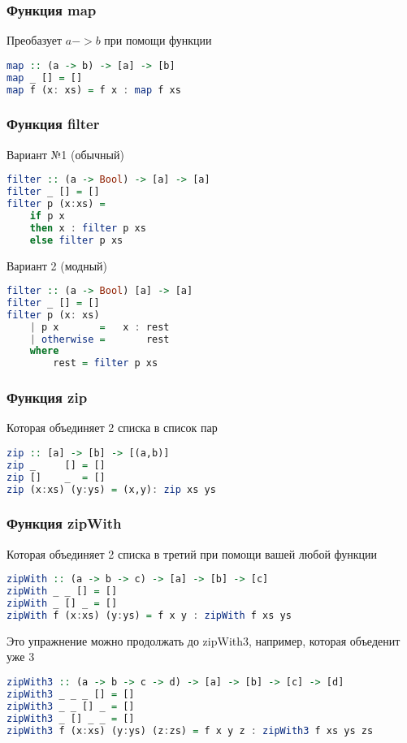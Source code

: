 \documentclass[10pt, a4paper]{article}
\begin{document}
\subsubsection{Функция map}

Преобазует $a -> b$ при помощи функции

\begin{lstlisting}[language=haskell]
map :: (a -> b) -> [a] -> [b]
map _ [] = []
map f (x: xs) = f x : map f xs
\end{lstlisting}

\subsubsection{Функция filter}

Вариант №1 (обычный)
\begin{lstlisting}[language=haskell]
filter :: (a -> Bool) -> [a] -> [a]
filter _ [] = []
filter p (x:xs) = 
    if p x 
    then x : filter p xs 
    else filter p xs
\end{lstlisting}

Вариант 2 (модный)
\begin{lstlisting}[language=haskell]
filter :: (a -> Bool) [a] -> [a]
filter _ [] = []
filter p (x: xs)
    | p x       =   x : rest
    | otherwise =       rest
    where 
        rest = filter p xs
\end{lstlisting}

\subsubsection{Функция zip}

Которая объединяет 2 списка в список пар

\begin{lstlisting}[language=haskell]
zip :: [a] -> [b] -> [(a,b)]
zip _     [] = []
zip []    _  = []
zip (x:xs) (y:ys) = (x,y): zip xs ys
\end{lstlisting}

\subsubsection{Функция zipWith}

Которая объединяет 2 списка в третий при помощи вашей любой функции

\begin{lstlisting}[language=haskell]
zipWith :: (a -> b -> c) -> [a] -> [b] -> [c]
zipWith _ _ [] = []
zipWith _ [] _ = []
zipWith f (x:xs) (y:ys) = f x y : zipWith f xs ys
\end{lstlisting}

Это упражнение можно продолжать до zipWith3, например, которая объеденит уже 3 

\begin{lstlisting}[language=haskell]
zipWith3 :: (a -> b -> c -> d) -> [a] -> [b] -> [c] -> [d]
zipWith3 _ _ _ [] = []
zipWith3 _ _ [] _ = []
zipWith3 _ [] _ _ = []
zipWith3 f (x:xs) (y:ys) (z:zs) = f x y z : zipWith3 f xs ys zs
\end{lstlisting}
\end{document}
